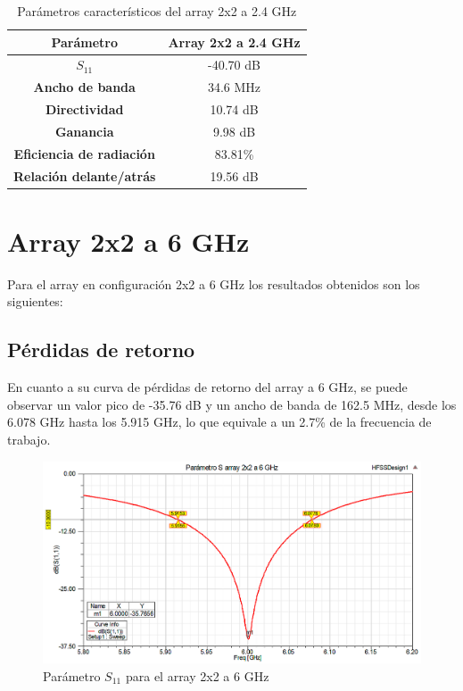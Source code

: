 \begin{table}[H]
  
   
   \small %
   \centering %
   \begin{tabular}{c c} %
   \toprule[\heavyrulewidth]\toprule[\heavyrulewidth]
   \textbf{Parámetro} & \textbf{Array 2x2 a 2.4 GHz} \\ 
   \midrule
   \textbf{$S_{11}$} & -40.70 dB \\
   \textbf{Ancho de banda} & 34.6 MHz \\
   \textbf{Directividad} & 10.74 dB \\
   \textbf{Ganancia} & 9.98 dB \\
   \textbf{Eficiencia de radiación} & 83.81\% \\
   \textbf{Relación delante/atrás} & 19.56 dB \\

   \bottomrule[\heavyrulewidth] 
   \end{tabular}
   
   \caption{Parámetros característicos del array 2x2 a 2.4 GHz} 
   \label{tab:res2x21}
\end{table}












\section{Array 2x2 a 6 GHz}
\par Para el array en configuración 2x2 a 6 GHz los resultados obtenidos son los siguientes:

\subsection{Pérdidas de retorno}
\par En cuanto a su curva de pérdidas de retorno del array a 6 GHz, se puede observar un valor pico de -35.76 dB y un ancho de banda de 162.5 MHz, desde los 6.078 GHz hasta los 5.915 GHz, lo que equivale a un 2.7\% de la frecuencia de trabajo.
\\
\begin{figure}[H]
    \centering
        \includegraphics[width=\textwidth]{archivos/analisis/2x22/1}
        \caption{Parámetro $S_{11}$ para el array 2x2 a 6 GHz}
        \label{fig:s2x22}
\end{figure}

